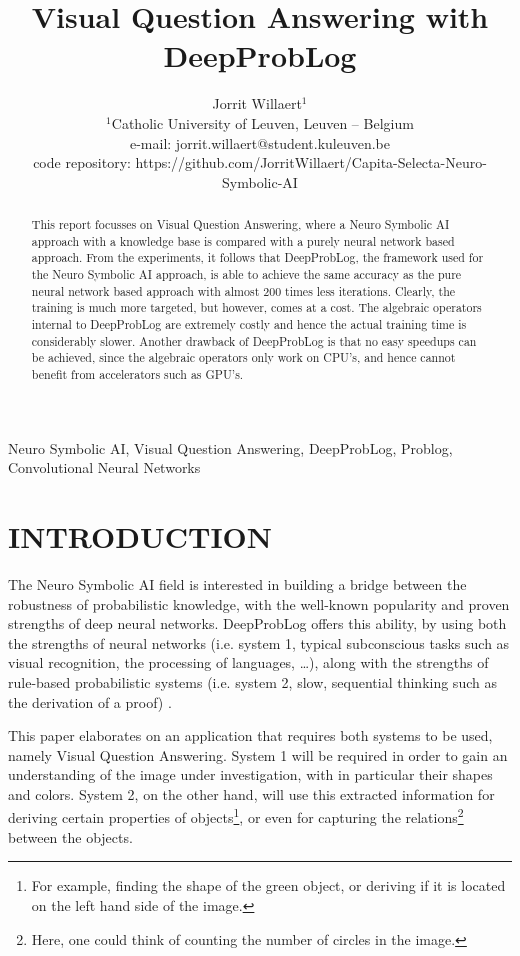 \documentclass[english]{sobraep}
\title{Visual Question Answering with DeepProbLog}
\author{Jorrit Willaert$^{1}$ \\
	\normalsize $^{1}$Catholic University of Leuven, Leuven -- Belgium \\
	\normalsize e-mail: jorrit.willaert@student.kuleuven.be \\
    \normalsize code repository: https://github.com/JorritWillaert/Capita-Selecta-Neuro-Symbolic-AI
}
\begin{document}
\maketitle

\begin{abstract}
	This report focusses on Visual Question Answering, where a Neuro Symbolic AI approach with a knowledge base is compared with a purely neural network based approach. From the experiments, it follows that DeepProbLog, the framework used for the Neuro Symbolic AI approach, is able to achieve the same accuracy as the pure neural network based approach with almost 200 times less iterations. Clearly, the training is much more targeted, but however, comes at a cost. The algebraic operators internal to DeepProbLog are extremely costly and hence the actual training time is considerably slower. Another drawback of DeepProbLog is that no easy speedups can be achieved, since the algebraic operators only work on CPU's, and hence cannot benefit from accelerators such as GPU's.
\end{abstract}

\begin{keywords}
	Neuro Symbolic AI, Visual Question Answering, DeepProbLog, Problog, Convolutional Neural Networks
\end{keywords}

\section{INTRODUCTION}
The Neuro Symbolic AI field is interested in building a bridge between the robustness of probabilistic knowledge, with the well-known popularity and proven strengths of deep neural networks. DeepProbLog \cite{deepproblog} offers this ability, by using both the strengths of neural networks (i.e. system 1, typical subconscious tasks such as visual recognition, the processing of languages, \dots), along with the strengths of rule-based probabilistic systems (i.e. system 2, slow, sequential thinking such as the derivation of a proof) \cite{sys1and2}. 

This paper elaborates on an application that requires both systems to be used, namely Visual Question Answering. System 1 will be required in order to gain an understanding of the image under investigation, with in particular their shapes and colors. System 2, on the other hand, will use this extracted information for deriving certain properties of objects\footnote{For example, finding the shape of the green object, or deriving if it is located on the left hand side of the image.}, or even for capturing the relations\footnote{Here, one could think of counting the number of circles in the image.} between the objects. 
\end{document}
